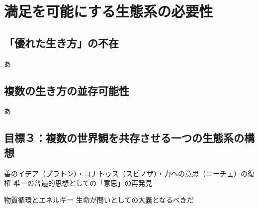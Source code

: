 \section{満足を可能にする生態系の必要性}\label{ux7d50ux8ad6uxff13ux6e80ux8db3ux3092ux53efux80fdux306bux3059ux308bux751fux614bux7cfbux306eux5fc5ux8981ux6027}

\subsection{「優れた生き方」の不在}\label{ux512aux308cux305fux751fux304dux65b9ux306eux4e0dux5728}

あ

\subsection{複数の生き方の並存可能性}\label{ux8907ux6570ux306eux751fux304dux65b9ux306eux4e26ux5b58ux53efux80fdux6027}

あ

\subsection{目標３：複数の世界観を共存させる一つの生態系の構想}\label{ux76eeux6a19uxff13ux8907ux6570ux306eux4e16ux754cux89b3ux3092ux5171ux5b58ux3055ux305bux308bux4e00ux3064ux306eux751fux614bux7cfbux306eux69cbux60f3}

善のイデア（プラトン）・コナトゥス（スピノザ）・力への意思（ニーチェ）の復権
唯一の普遍的思想としての「意思」の再発見

物質循環とエネルギー 生命が問いとしての大義となるべきだ
